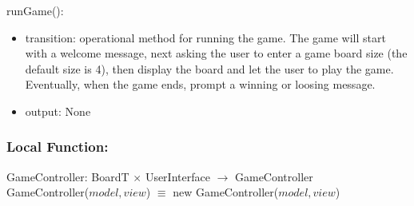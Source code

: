 \documentclass[12pt]{article}
\begin{document}
\noindent runGame():
\begin{itemize}
  \item transition: operational method for running the game. The game will start with a welcome message, next
                    asking the user to enter a game board size (the default size is 4), then display the board and let the user to play the game. 
                    Eventually, when the game ends, prompt a winning or loosing message.
  \item output: None
\end{itemize}

\subsubsection*{Local Function:}

GameController: BoardT $\times$ UserInterface $\rightarrow$ GameController \\
GameController($model, view$) $\equiv$ new GameController($model, view$)

\newpage
\end{document}
